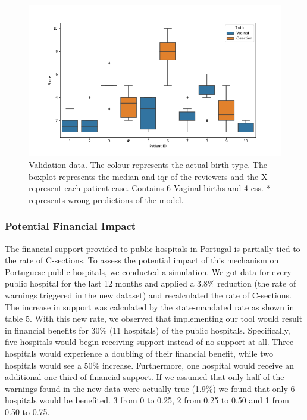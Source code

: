 
\begin{figure}[htbp]
\centering
\captionsetup{justification=centering}
\caption[Obstetrics questionnaires data]{Validation data. The colour represents the actual birth type. The boxplot represents the median and \ac{iqr} of the reviewers and the X represent each patient case. Contains 6 Vaginal births and 4 \acp{cs}. * represents wrong predictions of the model.}\label{fig:clinical} 
\includegraphics[scale=0.60]{figures/clinical_assessment.png}
\end{figure}




\subsubsection{Potential Financial Impact}
The financial support provided to public hospitals in Portugal is partially tied to the rate of C-sections. To assess the potential impact of this mechanism on Portuguese public hospitals, we conducted a simulation. We got data for every public hospital for the last 12 months and applied a 3.8\% reduction (the rate of warnings triggered in the new dataset) and recalculated the rate of C-sections. The increase in support was calculated by the state-mandated rate as shown in table 5. With this new rate, we observed that implementing our tool would result in financial benefits for 30\% (11 hospitals) of the public hospitals. Specifically, five hospitals would begin receiving support instead of no support at all. Three hospitals would experience a doubling of their financial benefit, while two hospitals would see a 50\% increase. Furthermore, one hospital would receive an additional one third of financial support. If we assumed that only half of the warnings found in the new data were actually true (1.9\%) we found that only 6 hospitals would be benefited. 3 from 0 to 0.25, 2 from 0.25 to 0.50 and 1 from 0.50 to 0.75.


